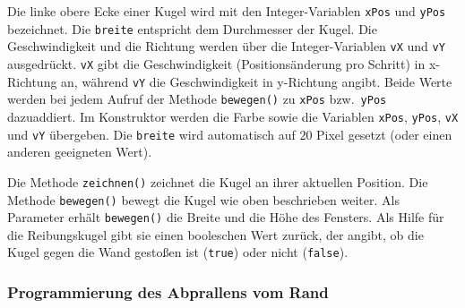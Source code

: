 Die linke obere Ecke einer Kugel wird mit den Integer-Variablen \lstinline|xPos| und
\lstinline|yPos| bezeichnet. Die \lstinline|breite| entspricht dem Durchmesser der Kugel.
Die Geschwindigkeit und die Richtung werden über die Integer-Variablen
\lstinline|vX| und \lstinline|vY| ausgedrückt. \lstinline|vX| gibt die
Geschwindigkeit (Positionsänderung pro Schritt) in x-Richtung an, während
\lstinline|vY| die Geschwindigkeit in y-Richtung angibt. Beide Werte werden bei
jedem Aufruf der Methode \lstinline|bewegen()| zu \lstinline|xPos| bzw.\
\lstinline|yPos| dazuaddiert. Im Konstruktor werden die Farbe sowie die
Variablen \lstinline|xPos|, \lstinline|yPos|, \lstinline|vX| und \lstinline|vY|
übergeben. Die \lstinline|breite| wird automatisch auf $20$ Pixel gesetzt
(oder einen anderen geeigneten Wert).

Die Methode \lstinline|zeichnen()| zeichnet die Kugel an ihrer aktuellen Position.
Die Methode \lstinline|bewegen()| bewegt die Kugel wie oben beschrieben weiter. Als
Parameter erhält \lstinline|bewegen()| die Breite und die Höhe des Fensters. Als Hilfe
für die Reibungskugel gibt sie einen booleschen Wert zurück, der angibt, ob die
Kugel gegen die Wand gestoßen ist (\lstinline|true|) oder nicht (\lstinline|false|).

\subsubsection{Programmierung des Abprallens vom Rand}


